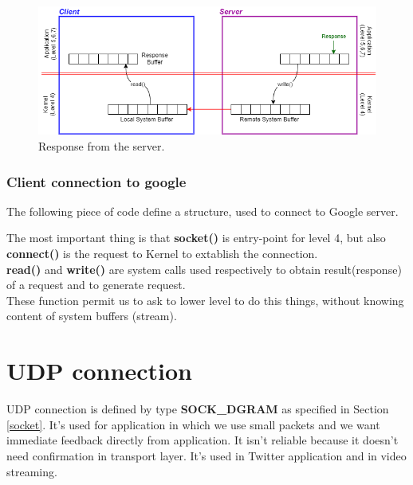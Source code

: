 \begin{figure}[h]
\centering
\includegraphics[scale=0.6]{Images/NetworkC/read_write2}\caption{\footnotesize{Response from the server.}}\label{rw2}
\end{figure}

\clearpage
\subsubsection{Client connection to google}
The following piece of code define a structure, used to connect to Google server. 


The most important thing is that \textbf{socket()} is entry-point for level 4, but also \textbf{connect()} is the request to Kernel to extablish the connection.\\ \textbf{read()} and \textbf{write()} are system calls used respectively to obtain result(response) of a request and to generate request.\\ These function permit us to ask to lower level to do this things, without knowing content of system buffers (stream).

\section{UDP connection}
UDP connection is defined by type \textbf{SOCK\_DGRAM} as specified in Section \ref{socket}. It's used for application in which we use small packets and we want immediate feedback directly from application. It isn't reliable because it doesn't need confirmation in transport layer. It's used in Twitter application and in video streaming.  